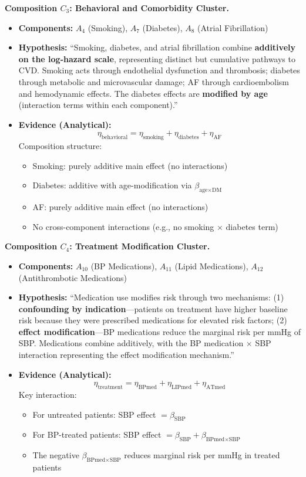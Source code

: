 \documentclass{article}
\begin{document}
\textbf{Composition $C_3$: Behavioral and Comorbidity Cluster.}
\begin{itemize}
    \item \textbf{Components:} $A_4$ (Smoking), $A_7$ (Diabetes), $A_8$ (Atrial Fibrillation)
    \item \textbf{Hypothesis:} ``Smoking, diabetes, and atrial fibrillation combine \textbf{additively on the log-hazard scale}, representing distinct but cumulative pathways to CVD. Smoking acts through endothelial dysfunction and thrombosis; diabetes through metabolic and microvascular damage; AF through cardioembolism and hemodynamic effects. The diabetes effects are \textbf{modified by age} (interaction terms within each component).''
    \item \textbf{Evidence (Analytical):}
    \[
    \eta_{\text{behavioral}} = \eta_{\text{smoking}} + \eta_{\text{diabetes}} + \eta_{\text{AF}}
    \]
    Composition structure:
    \begin{itemize}
        \item Smoking: purely additive main effect (no interactions)
        \item Diabetes: additive with age-modification via $\beta_{\text{age} \times \text{DM}}$
        \item AF: purely additive main effect (no interactions)
        \item No cross-component interactions (e.g., no smoking $\times$ diabetes term)
    \end{itemize}
\end{itemize}

\textbf{Composition $C_4$: Treatment Modification Cluster.}
\begin{itemize}
    \item \textbf{Components:} $A_{10}$ (BP Medications), $A_{11}$ (Lipid Medications), $A_{12}$ (Antithrombotic Medications)
    \item \textbf{Hypothesis:} ``Medication use modifies risk through two mechanisms: (1) \textbf{confounding by indication}---patients on treatment have higher baseline risk because they were prescribed medications for elevated risk factors; (2) \textbf{effect modification}---BP medications reduce the marginal risk per mmHg of SBP. Medications combine additively, with the BP medication $\times$ SBP interaction representing the effect modification mechanism.''
    \item \textbf{Evidence (Analytical):}
    \[
    \eta_{\text{treatment}} = \eta_{\text{BPmed}} + \eta_{\text{LIPmed}} + \eta_{\text{ATmed}}
    \]
    Key interaction:
    \begin{itemize}
        \item For untreated patients: SBP effect $= \beta_{\text{SBP}}$
        \item For BP-treated patients: SBP effect $= \beta_{\text{SBP}} + \beta_{\text{BPmed} \times \text{SBP}}$
        \item The negative $\beta_{\text{BPmed} \times \text{SBP}}$ reduces marginal risk per mmHg in treated patients
    \end{itemize}
\end{itemize}
\end{document}
